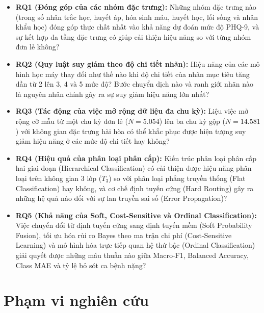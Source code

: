 \begin{itemize}
    \item \textbf{RQ1 (Đóng góp của các nhóm đặc trưng):} Những nhóm đặc trưng nào (trong số nhân trắc học, huyết áp, hóa sinh máu, huyết học, lối sống và nhân khẩu học) đóng góp thực chất nhất vào khả năng dự đoán mức độ PHQ-9, và sự kết hợp đa tầng đặc trưng có giúp cải thiện hiệu năng so với từng nhóm đơn lẻ không?
    \item \textbf{RQ2 (Quy luật suy giảm theo độ chi tiết nhãn):} Hiệu năng của các mô hình học máy thay đổi như thế nào khi độ chi tiết của nhãn mục tiêu tăng dần từ 2 lên 3, 4 và 5 mức độ? Bước chuyển dịch nào và ranh giới nhãn nào là nguyên nhân chính gây ra sự suy giảm hiệu năng lớn nhất?
    \item \textbf{RQ3 (Tác động của việc mở rộng dữ liệu đa chu kỳ):} Liệu việc mở rộng cỡ mẫu từ một chu kỳ đơn lẻ ($N = 5.054$) lên ba chu kỳ gộp ($N = 14.581$) với không gian đặc trưng hài hòa có thể khắc phục được hiện tượng suy giảm hiệu năng ở các mức độ chi tiết hay không?
    \item \textbf{RQ4 (Hiệu quả của phân loại phân cấp):} Kiến trúc phân loại phân cấp hai giai đoạn (Hierarchical Classification) có cải thiện được hiệu năng phân loại trên không gian 3 lớp ($T_3$) so với phân loại phẳng truyền thống (Flat Classification) hay không, và cơ chế định tuyến cứng (Hard Routing) gây ra những hệ quả nào đối với sự lan truyền sai số (Error Propagation)?
    \item \textbf{RQ5 (Khả năng của Soft, Cost-Sensitive và Ordinal Classification):} Việc chuyển đổi từ định tuyến cứng sang định tuyến mềm (Soft Probability Fusion), tối ưu hóa rủi ro Bayes theo ma trận chi phí (Cost-Sensitive Learning) và mô hình hóa trực tiếp quan hệ thứ bậc (Ordinal Classification) giải quyết được những mâu thuẫn nào giữa Macro-F1, Balanced Accuracy, Class MAE và tỷ lệ bỏ sót ca bệnh nặng?
\end{itemize}

\section{Phạm vi nghiên cứu}
\label{sec:pham-vi-nghien-cuu}

